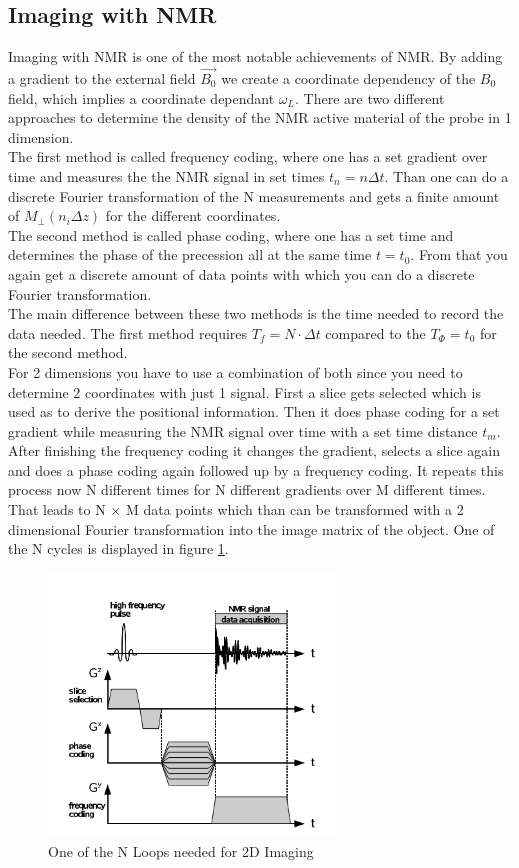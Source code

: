 \subsection{Imaging with NMR}\label{imagening}
Imaging with NMR is one of the most notable achievements of NMR. By adding a gradient to the external field $\vec{B_0}$ we create a coordinate dependency of the $B_0$ field, which implies a coordinate dependant $\omega_L$. There are two different approaches to determine the density of the NMR active material of the probe in 1 dimension.
\vspace{2mm}\\
The first method is called frequency coding, where one has a set gradient over time and measures the  the NMR signal in set times $t_n = n \Delta t$. Than one can do a discrete Fourier transformation of the N measurements and gets a finite amount of $M_{\perp}(n_i \Delta z)$ for the different coordinates. 
\vspace{2mm}\\
The second method is called phase coding, where one has a set time and determines the phase of the precession all at the same time $t = t_0$. From that you again get a discrete amount of data points with which you can do a discrete Fourier transformation. 
\vspace{2mm}\\
The main difference between these two methods is the time needed to record the data needed. The first method requires $T_f = N \cdot \Delta t$ compared to the $T_{\Phi} = t_0$ for the second method.
\vspace{3mm}\\
For 2 dimensions you have to use a combination of both since you need to determine 2 coordinates with just 1 signal. First a slice gets selected which is used as to derive the positional information. Then it does phase coding for a set gradient while measuring the NMR signal over time with a set time distance $t_m$. After finishing the frequency coding it changes the gradient, selects a slice again and does a phase coding again followed up by a frequency coding. It repeats this process now N different times for N different gradients over M different times. That leads to N $\times$ M data points which than can be transformed with a 2 dimensional Fourier transformation into the image matrix of the object. One of the N cycles is displayed in figure \ref{2dfourier}.\\
\begin{figure}[h]
	\centering
	\includegraphics[width=0.7\linewidth ,height=7cm]{images/2d_fourier.png}
	\caption{One of the N Loops needed for 2D Imaging}
	\label{2dfourier}
\end{figure}
